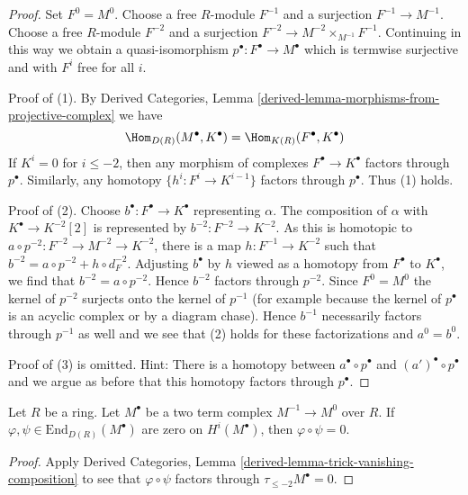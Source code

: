 \begin{proof}
Set $F^0 = M^0$.
Choose a free $R$-module $F^{-1}$ and a surjection $F^{-1} \to M^{-1}$.
Choose a free $R$-module $F^{-2}$ and a surjection
$F^{-2} \to M^{-2} \times_{M^{-1}} F^{-1}$. Continuing in this
way we obtain a quasi-isomorphism $p^\bullet : F^\bullet \to M^\bullet$
which is termwise surjective and with $F^i$ free for all $i$.

\medskip\noindent
Proof of (1). By
Derived Categories, Lemma \ref{derived-lemma-morphisms-from-projective-complex}
we have
$$
\Hom_{D(R)}(M^\bullet, K^\bullet) = \Hom_{K(R)}(F^\bullet, K^\bullet)
$$
If $K^i = 0$ for $i \leq -2$, then any morphism of complexes
$F^\bullet \to K^\bullet$ factors through $p^\bullet$. Similarly, any
homotopy $\{h^i : F^i \to K^{i - 1}\}$ factors through $p^\bullet$.
Thus (1) holds.

\medskip\noindent
Proof of (2). Choose $b^\bullet : F^\bullet \to K^\bullet$ representing
$\alpha$. The composition of $\alpha$ with $K^\bullet \to K^{-2}[2]$ is
represented by $b^{-2} : F^{-2} \to K^{-2}$. As this is homotopic to
$a \circ p^{-2} : F^{-2} \to M^{-2} \to K^{-2}$, there is a map
$h : F^{-1} \to K^{-2}$ such that $b^{-2} = a \circ p^{-2} + h \circ d_F^{-2}$.
Adjusting $b^\bullet$ by $h$ viewed as a homotopy from $F^\bullet$
to $K^\bullet$, we find that $b^{-2} = a \circ p^{-2}$. Hence $b^{-2}$
factors through $p^{-2}$. Since $F^0 = M^0$ the kernel of $p^{-2}$
surjects onto the kernel of $p^{-1}$ (for example because the kernel
of $p^\bullet$ is an acyclic complex or by a diagram chase). Hence $b^{-1}$
necessarily factors through $p^{-1}$ as well and we see that (2)
holds for these factorizations and $a^0 = b^0$.

\medskip\noindent
Proof of (3) is omitted. Hint: There is a homotopy between
$a^\bullet \circ p^\bullet$ and $(a')^\bullet \circ p^\bullet$
and we argue as before that this homotopy factors through $p^\bullet$.
\end{proof}

\begin{lemma}
\label{lemma-zero-in-derived}
Let $R$ be a ring. Let $M^\bullet$ be a two term complex $M^{-1} \to M^0$
over $R$. If $\varphi, \psi \in \text{End}_{D(R)}(M^\bullet)$
are zero on $H^i(M^\bullet)$, then $\varphi \circ \psi = 0$.
\end{lemma}

\begin{proof}
Apply
Derived Categories, Lemma \ref{derived-lemma-trick-vanishing-composition}
to see that $\varphi \circ \psi$ factors through $\tau_{\leq -2}M^\bullet = 0$.
\end{proof}



